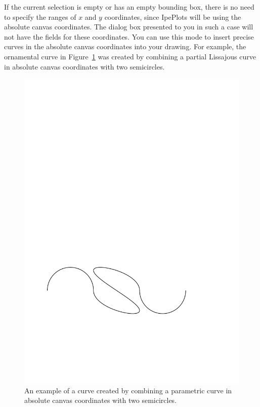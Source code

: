 \documentclass{article}
\begin{document}
If the current selection is empty or has an empty bounding box, there is no
need to specify the ranges of $x$ and $y$ coordinates, since IpePlots will be
using the absolute canvas coordinates.  The dialog box presented to you in such
a case will not have the fields for these coordinates.  You can use this mode
to insert precise curves in the absolute canvas coordinates into your drawing.
For example, the ornamental curve in Figure~\ref{fig:spliced_curve} was created by
combining a partial Lissajous curve in absolute canvas coordinates with two
semicircles.

\begin{figure}[h]
   \begin{center}
      \includegraphics[scale=.5]{spliced_curve}
   \end{center}
   \caption{An example of a curve created by combining a parametric curve in
   absolute canvas coordinates with two semicircles.}
   \label{fig:spliced_curve}
\end{figure}
\end{document}

